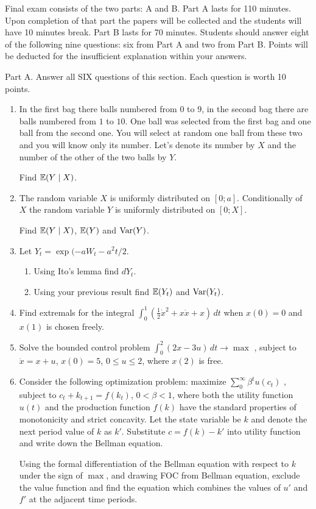 \documentclass[12pt, a4paper]{article}
\begin{document}
Final exam consists of the two parts: A and B. Part A lasts for 110 minutes.
Upon completion of that part the papers will be collected and the students will have 10 minutes break.
Part B lasts for 70 minutes.
Students should answer eight of the following nine questions: six from Part A  and two from Part B.
Points will be deducted for the insufficient explanation within your answers.

Part A.
Answer all SIX questions of this section. Each question is worth 10 points.

\begin{enumerate}
\item In the first bag there balls numbered from $0$ to $9$, in the second bag there are balls numbered from $1$ to $10$. 
One ball was selected from the first bag and one ball from the second one. 
You will select at random one ball from these two and you will know only its number. 
Let's denote its number by $X$ and the number of the other of the two balls by $Y$.

Find $\operatorname{\mathbb{E}}(Y\mid X)$.

\item The random variable $X$ is uniformly distributed on $[0;a]$. 
Conditionally of $X$ the random variable $Y$ is uniformly distributed on $[0;X]$.

Find $\operatorname{\mathbb{E}}(Y\mid X)$, $\operatorname{\mathbb{E}}(Y)$  and $\operatorname{Var}(Y)$.

\item Let $Y_t=\exp(-aW_t-{a^2 t}/{2}$.
\begin{enumerate}
\item Using Ito's lemma find $dY_t$.
\item Using your previous result find $\operatorname{\mathbb{E}}(Y_t)$ and $\operatorname{Var}(Y_t)$.
\end{enumerate}

\item Find extremals for the integral
$\int_0^1 \left(\frac{1}{2}\dot{x}^2+x\dot{x}+x\right)\, dt$
when $x(0)=0$ and $x(1)$ is chosen freely.

\item Solve the bounded control problem
$\int_0^2 (2x-3u)\,dt \to \max$
, subject to $\dot{x}=x+u$, $x(0)=5$, $0\leq u \leq 2$, where $x(2)$ is free.

\item Consider the following optimization problem: maximize
$\sum_0^{\infty}\beta^t u(c_t)$
, subject to $c_t+k_{t+1}=f(k_t)$, $0<\beta<1$, where both the utility function $u(t)$  and the production function $f(k)$ have the standard properties of monotonicity and strict concavity. Let the state variable be $k$ and denote the next period value of $k$ as $k'$. Substitute $c=f(k)-k'$ into utility function and write down the Bellman equation.


Using the formal differentiation of the Bellman equation with respect to $k$ under the sign of $\max$, and drawing  FOC from Bellman equation, exclude the value function and find the equation which combines the values of $u'$ and $f'$  at the adjacent time periods.

\end{enumerate}
\end{document}
